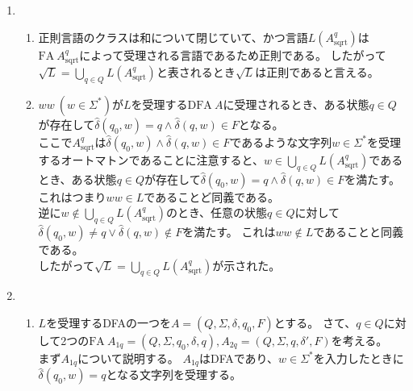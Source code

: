 \documentclass[uplatex,dvipdfmx,a4paper,10pt]{jsarticle}
\begin{document}
\begin{enumerate}
      \item \begin{enumerate}
              \item \hspace{1em}正則言語のクラスは和について閉じていて、かつ言語\(L(A^{q}_\text{sqrt})\)は\(\text{FA}\ A^{q}_\text{sqrt}\)によって受理される言語であるため正則である。
                    したがって\(\sqrt{L} = \bigcup_{q \in Q}L(A_\text{sqrt}^{q})\)と表されるとき\(\sqrt{L}\)は正則であると言える。 \\
              \item \hspace{1em}\(ww\ (w \in \Sigma^{*})\)が\(L\)を受理する\(\text{DFA}\ A\)に受理されるとき、ある状態\(q \in Q\)が存在して\(\hat{\delta}(q_0, w) = q \land \hat{\delta}(q, w) \in F\)となる。 \\
                    \hspace{1em}ここで\(A_\text{sqrt}^{q}\)は\(\hat{\delta}(q_0, w) \land \hat{\delta}(q, w) \in F\)であるような文字列\(w \in \Sigma^{*}\)を受理するオートマトンであることに注意すると、\(w \in \bigcup_{q \in Q}L(A_\text{sqrt}^{q})\)であるとき、ある状態\(q \in Q\)が存在して\(\hat{\delta}(q_0, w) = q \land \hat{\delta}(q, w) \in F\)を満たす。
                    これはつまり\(ww \in L\)であることど同義である。 \\
                    \hspace{1em}逆に\(w \notin \bigcup_{q \in Q}L(A_\text{sqrt}^{q})\)のとき、任意の状態\(q \in Q\)に対して\(\hat{\delta}(q_0, w) \neq q \lor \hat{\delta}(q, w) \notin F\)を満たす。
                    これは\(ww \notin L\)であることと同義である。 \\
                    \hspace{1em}したがって\(\sqrt{L} = \bigcup_{q \in Q}L(A_\text{sqrt}^{q})\)が示された。 \\
            \end{enumerate}
      \item \begin{enumerate}
                  \item \hspace{1em}\(L\)を受理するDFAの一つを\(A = (Q, \Sigma, \delta, q_0, F)\)とする。
                        さて、\(q \in Q\)に対して2つの\(\text{FA}\ A_{1q} = (Q, \Sigma, q_0, \delta, {q}), A_{2q} = (Q, \Sigma, q, \delta', F)\)を考える。 \\
                        \hspace{1em}まず\(A_{1q}\)について説明する。
                        \(A_{1q}\)はDFAであり、\(w \in \Sigma^{*}\)を入力したときに\(\hat{\delta}(q_0, w) = q\)となる文字列を受理する。\\

\end{enumerate}
\end{enumerate}
\end{document}
